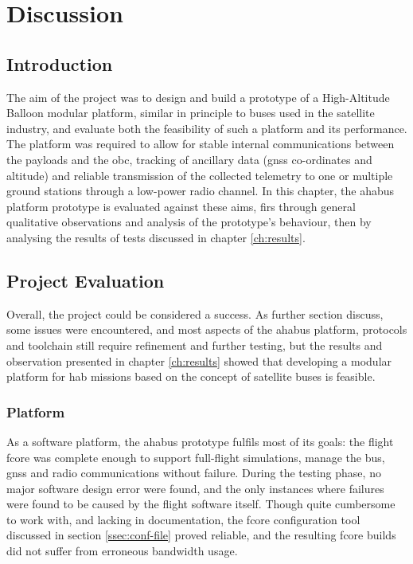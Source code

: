 \chapter{Discussion}
\label{ch:discussion}

\section{Introduction}

The aim of the project was to design and build a prototype of a High-Altitude
Balloon modular platform, similar in principle to buses used in the satellite
industry, and evaluate both the feasibility of such a platform and its
performance. The platform was required to allow for stable internal
communications between the payloads and the \acrlong{obc}, tracking of
ancillary data (\acrshort{gnss} co-ordinates and altitude) and reliable
transmission of the collected telemetry to one or multiple ground stations 
through a low-power radio channel. In this chapter, the \acrshort{ahabus}
platform prototype is evaluated against these aims, firs through general 
qualitative observations and analysis of the prototype's behaviour, then by
analysing the results of tests discussed in chapter \ref{ch:results}.

\section{Project Evaluation}

Overall, the project could be considered a success. As further section discuss,
some issues were encountered, and most aspects of the \acrshort{ahabus}
platform, protocols and toolchain still require refinement and further testing,
but the results and observation presented in chapter \ref{ch:results} showed
that developing a modular platform for \acrlong{hab} missions based on the
concept of satellite buses is feasible.

\subsection{Platform}

As a software platform, the \acrshort{ahabus} prototype fulfils most of its
goals: the flight \acrshort{fcore} was complete enough to support full-flight
simulations, manage the bus, \acrshort{gnss} and radio communications without
failure. During the testing phase, no major software design error were found,
and the only instances where failures were found to be caused by the flight
software itself. Though quite cumbersome to work with, and lacking in
documentation, the \acrshort{fcore} configuration tool discussed in section
\ref{ssec:conf-file} proved reliable, and the resulting \acrshort{fcore} builds
did not suffer from erroneous bandwidth usage.

